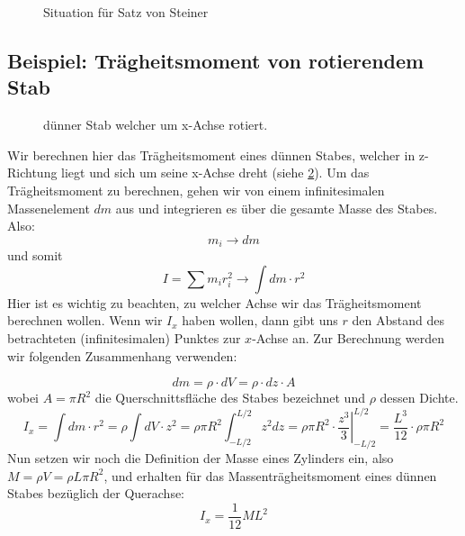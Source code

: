 \documentclass[12pt]{article}
\begin{document}
\begin{figure}[H]
  \caption{Situation für Satz von Steiner}
  \label{fig:stab}
\end{figure} 

\newpage
\subsection{Beispiel: Trägheitsmoment von rotierendem Stab}

\begin{figure}[H]
  \caption{dünner Stab welcher um x-Achse rotiert.}
  \label{fig:stab}
\end{figure} 

Wir berechnen hier das Trägheitsmoment eines dünnen Stabes, welcher in z-Richtung liegt und sich um seine x-Achse dreht (siehe \cref{fig:stab}). Um das Trägheitsmoment zu berechnen, gehen wir von einem infinitesimalen Massenelement $dm$ aus und integrieren es über die gesamte Masse des Stabes. Also: 
\begin{equation*}
 m_i \rightarrow dm
\end{equation*}
und somit
\begin{equation*}
 I = \sum m_i r_i^2 \rightarrow \int dm \cdot r^2
\end{equation*}
Hier ist es wichtig zu beachten, zu welcher Achse wir das Trägheitsmoment berechnen wollen. Wenn wir $I_x$ haben wollen, dann gibt uns $r$ den Abstand des betrachteten (infinitesimalen) Punktes zur $x$-Achse an. Zur Berechnung werden wir folgenden Zusammenhang verwenden: 

\begin{equation*}
 dm = \rho \cdot dV = \rho \cdot dz \cdot A
\end{equation*}
wobei $A = \pi R^2$ die Querschnittsfläche des Stabes bezeichnet und $\rho$ dessen Dichte.
\begin{equation}
I_x = \int dm \cdot r^2 = \rho \int dV \cdot z^2 = \rho \pi R^2 \int_{-L/2}^{L/2} z^2  dz  = \rho \pi R^2 \cdot \left. \dfrac{z^3}{3} \right|_{-L/2}^{L/2} = \dfrac{L^3}{12} \cdot \rho \pi R^2
\end{equation}
Nun setzen wir noch die Definition der Masse eines Zylinders ein, also $M = \rho V = \rho L \pi R^2$, und erhalten für das Massenträgheitsmoment eines dünnen Stabes bezüglich der Querachse:
\begin{equation}
I_x = \dfrac{1}{12} ML^2
\end{equation}
\end{document}
